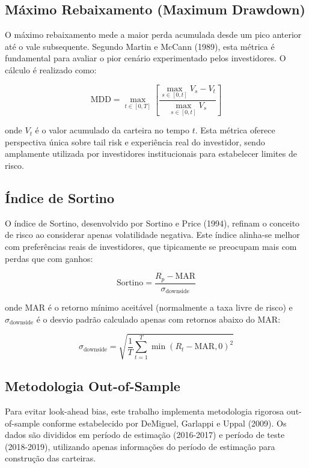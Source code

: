 \subsection{Máximo Rebaixamento (Maximum Drawdown)}

O máximo rebaixamento mede a maior perda acumulada desde um pico anterior até o vale subsequente. Segundo Martin e McCann (1989), esta métrica é fundamental para avaliar o pior cenário experimentado pelos investidores. O cálculo é realizado como:

\begin{equation}
\text{MDD} = \max_{t \in [0,T]} \left[ \frac{\max_{s \in [0,t]} V_s - V_t}{\max_{s \in [0,t]} V_s} \right]
\end{equation}

onde $V_t$ é o valor acumulado da carteira no tempo $t$. Esta métrica oferece perspectiva única sobre tail risk e experiência real do investidor, sendo amplamente utilizada por investidores institucionais para estabelecer limites de risco.

\subsection{Índice de Sortino}

O índice de Sortino, desenvolvido por Sortino e Price (1994), refinam o conceito de risco ao considerar apenas volatilidade negativa. Este índice alinha-se melhor com preferências reais de investidores, que tipicamente se preocupam mais com perdas que com ganhos:

\begin{equation}
\text{Sortino} = \frac{R_p - \text{MAR}}{\sigma_{\text{downside}}}
\end{equation}

onde MAR é o retorno mínimo aceitável (normalmente a taxa livre de risco) e $\sigma_{\text{downside}}$ é o desvio padrão calculado apenas com retornos abaixo do MAR:

\begin{equation}
\sigma_{\text{downside}} = \sqrt{\frac{1}{T} \sum_{t=1}^{T} \min(R_t - \text{MAR}, 0)^2}
\end{equation}

\subsection{Metodologia Out-of-Sample}

Para evitar look-ahead bias, este trabalho implementa metodologia rigorosa out-of-sample conforme estabelecido por DeMiguel, Garlappi e Uppal (2009). Os dados são divididos em período de estimação (2016-2017) e período de teste (2018-2019), utilizando apenas informações do período de estimação para construção das carteiras.

